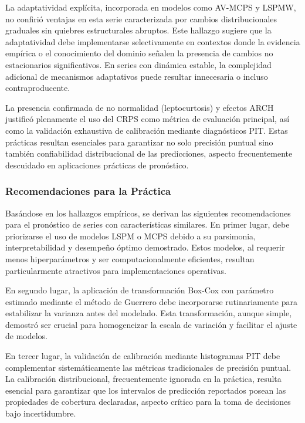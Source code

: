 La adaptatividad explícita, incorporada en modelos como AV-MCPS y LSPMW, no confirió ventajas en esta serie caracterizada por cambios distribucionales graduales sin quiebres estructurales abruptos. Este hallazgo sugiere que la adaptatividad debe implementarse selectivamente en contextos donde la evidencia empírica o el conocimiento del dominio señalen la presencia de cambios no estacionarios significativos. En series con dinámica estable, la complejidad adicional de mecanismos adaptativos puede resultar innecesaria o incluso contraproducente.

La presencia confirmada de no normalidad (leptocurtosis) y efectos ARCH justificó plenamente el uso del CRPS como métrica de evaluación principal, así como la validación exhaustiva de calibración mediante diagnósticos PIT. Estas prácticas resultan esenciales para garantizar no solo precisión puntual sino también confiabilidad distribucional de las predicciones, aspecto frecuentemente descuidado en aplicaciones prácticas de pronóstico.

\subsubsection{Recomendaciones para la Práctica}

Basándose en los hallazgos empíricos, se derivan las siguientes recomendaciones para el pronóstico de series con características similares. En primer lugar, debe priorizarse el uso de modelos LSPM o MCPS debido a su parsimonia, interpretabilidad y desempeño óptimo demostrado. Estos modelos, al requerir menos hiperparámetros y ser computacionalmente eficientes, resultan particularmente atractivos para implementaciones operativas.

En segundo lugar, la aplicación de transformación Box-Cox con parámetro estimado mediante el método de Guerrero debe incorporarse rutinariamente para estabilizar la varianza antes del modelado. Esta transformación, aunque simple, demostró ser crucial para homogeneizar la escala de variación y facilitar el ajuste de modelos.

En tercer lugar, la validación de calibración mediante histogramas PIT debe complementar sistemáticamente las métricas tradicionales de precisión puntual. La calibración distribucional, frecuentemente ignorada en la práctica, resulta esencial para garantizar que los intervalos de predicción reportados posean las propiedades de cobertura declaradas, aspecto crítico para la toma de decisiones bajo incertidumbre.

